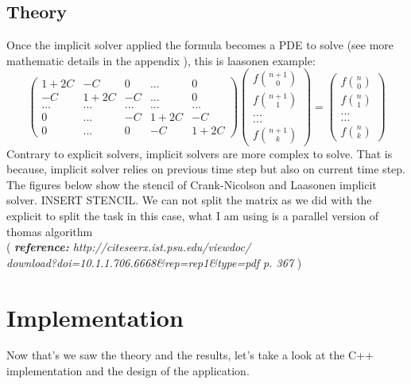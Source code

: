 \documentclass[12pt, a4paper]{report}
\begin{document}
\section{Theory}
Once the implicit solver applied the formula becomes a PDE to solve (see more mathematic details in the appendix ), this is laasonen example:
\begin{equation}
\begin{pmatrix}
1+2C & -C & 0 & ... & 0\\
-C & 1+2C & -C& ... & 0\\
...&...&...&...&...\\
 0 & ...& -C &1+2C & -C \\
0 & ... &  0& -C & 1+2C
\end{pmatrix}
\begin{pmatrix}
f\binom{n+1}{0}\\
f\binom{n+1}{1}\\
...\\
...\\
f\binom{n+1}{k}
\end{pmatrix}
=
\begin{pmatrix}
f\binom{n}{0}\\
f\binom{n}{1}\\
...\\
...\\
f\binom{n}{k}
\end{pmatrix}
\end{equation}
Contrary to explicit solvers, implicit solvers are more complex to solve. That is because, implicit solver relies on previous time step but also on current time step. The figures below show the stencil of Crank-Nicolson and Laasonen implicit solver.
INSERT STENCIL.
We can not split the matrix as we did with the explicit to split the task in this case, what I am using is a parallel version of thomas algorithm \\( \textit{\textbf{reference:} http://citeseerx.ist.psu.edu/viewdoc/\\download?doi=10.1.1.706.6668\&rep=rep1\&type=pdf p. 367 })



\chapter{Implementation}
Now that's we saw the theory and the results, let's take a look at the C++ implementation and the design of the application.
\end{document}
